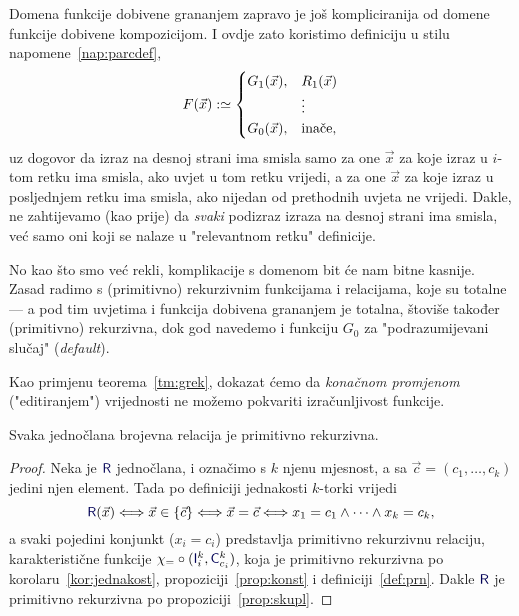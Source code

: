 Domena funkcije dobivene grananjem zapravo je još kompliciranija od domene funkcije dobivene kompozicijom. I ovdje zato koristimo definiciju u stilu napomene~\ref{nap:parcdef},
\begin{equation}
    F(\vec x):\simeq\begin{cases}
    G_1(\vec x),&R_1(\vec x)\\
    &\vdots\\
    G_0(\vec x),&\text{inače}\text,
    \end{cases}
\end{equation}
uz dogovor da izraz na desnoj strani ima smisla samo za one $\vec x$ za koje izraz u $i$-tom retku ima smisla, ako uvjet u tom retku vrijedi, a za one $\vec x$ za koje izraz u posljednjem retku ima smisla, ako nijedan od prethodnih uvjeta ne vrijedi. Dakle, ne zahtijevamo (kao prije) da \emph{svaki} podizraz izraza na desnoj strani ima smisla, već samo oni koji se nalaze u "relevantnom retku" definicije.

No kao što smo već rekli, komplikacije s domenom bit će nam bitne kasnije. Zasad radimo s (primitivno) rekurzivnim funkcijama i relacijama, koje su totalne --- a pod tim uvjetima i funkcija dobivena grananjem je totalna, štoviše također (primitivno) rekurzivna, dok god navedemo i funkciju $G_0$ za "podrazumijevani slučaj" (\emph{default}).


Kao primjenu teorema~\ref{tm:grek}, dokazat ćemo da \emph{konačnom promjenom} ("editiranjem") vrijednosti ne možemo pokvariti izračunljivost funkcije. %

\begin{lema}\label{lm:r1prn}
Svaka jednočlana brojevna relacija je primitivno rekurzivna.
\end{lema}
\begin{proof}
Neka je $\f R$ jednočlana, i označimo s $k$ njenu mjesnost, a sa $\vec c=(c_1,\dotsc,c_k)$ jedini njen element. Tada po definiciji jednakosti $k$-torki vrijedi
\begin{equation}
    \f R(\vec x)\Longleftrightarrow\vec x\in\{\vec c\}\Longleftrightarrow\vec x=\vec c\Longleftrightarrow x_1=c_1\land\dotsb\land x_k=c_k\text,
\end{equation}
a svaki pojedini konjunkt ($x_i=c_i$) predstavlja primitivno rekurzivnu relaciju, karakteristične funkcije $\chi_=\circ(\f I_i^k,\f C_{c_i}^k)$, koja je primitivno rekurzivna po korolaru~\ref{kor:jednakost}, propoziciji~\ref{prop:konst} i definiciji~\ref{def:prn}. Dakle $\f R$ je primitivno rekurzivna po propoziciji~\ref{prop:skupl}.
\end{proof}

